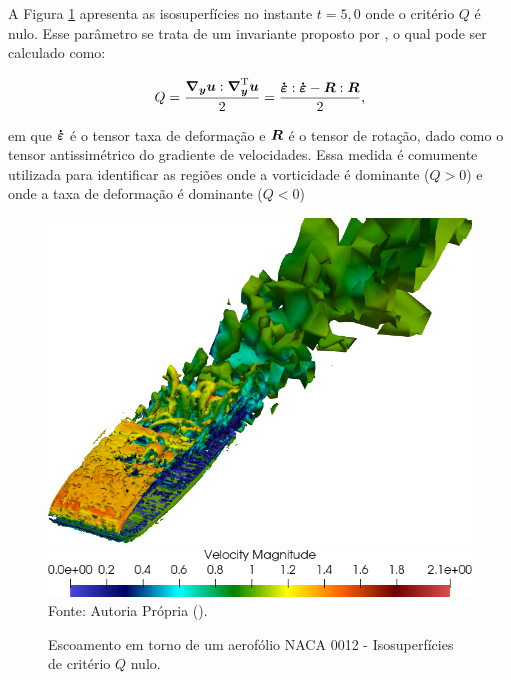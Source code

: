 A Figura \ref{fig:NACA0012-QCriterion} apresenta as isosuperfícies no instante $t=5,0$ onde o critério $Q$ é nulo. Esse parâmetro se trata de um invariante proposto por , o qual pode ser calculado como:

\begin{equation}
    Q=\frac{\boldsymbol{\nabla_y}\boldsymbol{u}:\boldsymbol{\nabla}^{\mathrm{T}}_{\boldsymbol{y}}\boldsymbol{u}}{2}=\frac{\boldsymbol{\dot{\boldsymbol{\varepsilon}}}:\boldsymbol{\dot{\boldsymbol{\varepsilon}}}-\boldsymbol{R}:\boldsymbol{R}}{2}\text{,}
\end{equation}

\noindent em que $\boldsymbol{\dot{\boldsymbol{\varepsilon}}}$ é o tensor taxa de deformação e $\boldsymbol{R}$ é o tensor de rotação, dado como o tensor antissimétrico do gradiente de velocidades. Essa medida é comumente utilizada para identificar as regiões onde a vorticidade é dominante ($Q>0$) e onde a taxa de deformação é dominante ($Q<0$) \cite{hunt1988eddies,piomelli2000large}

\begin{figure}[h!]
    \centering
    \caption{Escoamento em torno de um aerofólio NACA 0012 - Isosuperfícies de critério $Q$ nulo.}
    \includegraphics[width=.7\linewidth]{Figuras/NACA0012/QCriterion-500.png}
    \includegraphics[width=.5\linewidth]{Figuras/NACA0012/QCriterion-colormap-500.png}
    \\Fonte: Autoria Própria (\the\year).
    \label{fig:NACA0012-QCriterion}
\end{figure}
